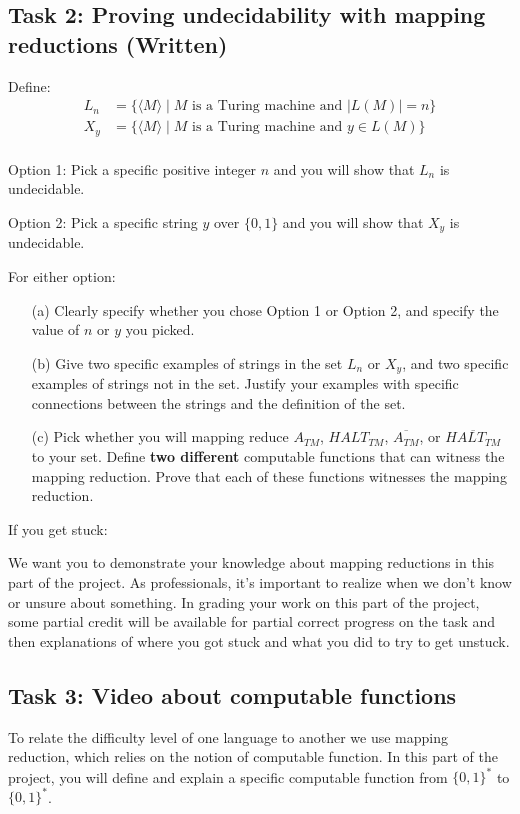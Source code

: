 \subsection*{Task 2: Proving undecidability with mapping reductions (Written)}

	Define:
	\begin{align*}
		L_n &= \{ \langle M \rangle \mid \textrm{$M$ is a Turing machine and } |L(M)| = n\} \\
		X_{y} & = \{ \langle M \rangle \mid \textrm{$M$ is a Turing machine and } y \in L(M)\} \\
	\end{align*}

	Option 1: Pick a specific positive integer $n$ and you will show that $L_n$ is undecidable.

	Option 2: Pick a specific string $y$ over $\{0,1\}$ and you will show that $X_y$ is undecidable.

	For either option:
	\begin{enumerate}
		\item[(a)] Clearly specify whether you chose Option 1 or Option 2, and specify the value of $n$ or $y$ you picked.
		\item[(b)] Give two specific examples of strings in the set $L_n$ or $X_y$, and two specific examples 
		of strings not in the set. Justify your examples with specific connections between the strings and the 
		definition of the set.
		\item[(c)] Pick whether you will mapping reduce $A_{TM}$, $HALT_{TM}$, $\overline{A_{TM}}$, or $\overline{HALT_{TM}}$
		to your set. Define {\bf two different} computable functions that can witness the mapping reduction.
		Prove that each of these functions witnesses the mapping reduction.
	\end{enumerate}

	If you get stuck:

	We want you to demonstrate your knowledge about mapping reductions in this part of the project.  
	As professionals, it's important to realize when we don't know or unsure about something.
	In grading your work on this part of the project, some partial credit will be available for 
	partial correct progress on the task and then explanations of where
	you got stuck and what you did to try to get unstuck.

		
\subsection*{Task 3: Video about computable functions}
To relate the difficulty level of one language to another we use mapping reduction, which relies
on the notion of computable function. In this part of the project, you will define and explain a specific 
computable function from $\{0,1\}^*$ to $\{0,1\}^*$.

